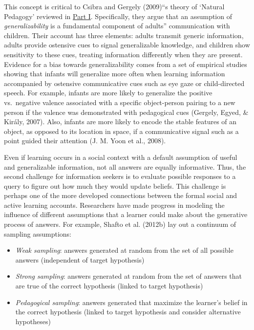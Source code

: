 \documentclass[english,floatsintext,man]{apa6}
\providecommand{\tightlist}{%
  \setlength{\itemsep}{0pt}\setlength{\parskip}{0pt}}
\theoremstyle{definition}
\theoremstyle{definition}
\theoremstyle{definition}
\theoremstyle{remark}
\begin{document}
This concept is critical to Csibra and Gergely (2009)\enquote{s theory
of \enquote{Natural Pedagogy} reviewed in \protect\hyperlink{p1}{Part
I}. Specifically, they argue that an assumption of
\emph{generalizability} is a fundamental component of adults}
communication with children. Their account has three elements: adults
transmit generic information, adults provide ostensive cues to signal
generalizable knowledge, and children show sensitivity to these cues,
treating information differently when they are present. Evidence for a
bias towards generalizability comes from a set of empirical studies
showing that infants will generalize more often when learning
information accompanied by ostensive communicative cues such as eye gaze
or child-directed speech. For example, infants are more likely to
generalize the positive vs.~negative valence associated with a specific
object-person pairing to a new person if the valence was demonstrated
with pedagogical cues (Gergely, Egyed, \& Király, 2007). Also, infants
are more likely to encode the stable features of an object, as opposed
to its location in space, if a communicative signal such as a point
guided their attention (J. M. Yoon et al., 2008).

Even if learning occurs in a social context with a default assumption of
useful and generalizable information, not all answers are equally
informative. Thus, the second challenge for information seekers is to
evaluate possible responses to a query to figure out how much they would
update beliefs. This challenge is perhaps one of the more developed
connections between the formal social and active learning accounts.
Researchers have made progress in modeling the influence of different
assumptions that a learner could make about the generative process of
answers. For example, Shafto et al. (2012b) lay out a continuum of
sampling assumptions:

\begin{itemize}
\tightlist
\item
  \emph{Weak sampling}: answers generated at random from the set of all
  possible answers (independent of target hypothesis)
\item
  \emph{Strong sampling}: answers generated at random from the set of
  answers that are true of the correct hypothesis (linked to target
  hypothesis)
\item
  \emph{Pedagogical sampling}: answers generated that maximize the
  learner's belief in the correct hypothesis (linked to target
  hypothesis and consider alternative hypotheses)
\end{itemize}
\end{document}
